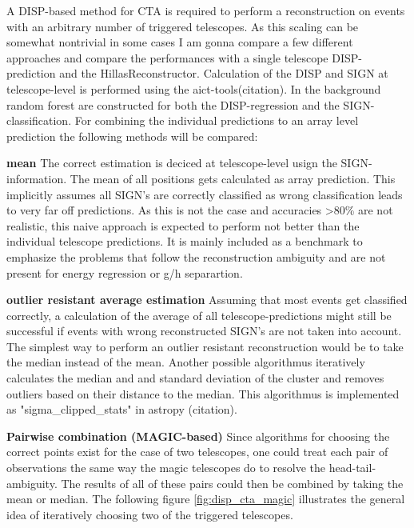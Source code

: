 A DISP-based method for CTA is required to perform a reconstruction on
events with an arbitrary number of triggered telescopes.
As this scaling can be somewhat nontrivial in some cases I am gonna
compare a few different approaches and compare the performances
with a single telescope DISP-prediction and the HillasReconstructor.
Calculation of the DISP and SIGN at
telescope-level is performed using the aict-tools(citation).
In the background random forest are constructed for both the
DISP-regression and the SIGN-classification.
For combining the individual predictions to an array level prediction
the following methods will be compared:

\textbf{mean}
The correct estimation is deciced at telescope-level usign the
SIGN-information. The mean of all positions gets calculated as
array prediction.
This implicitly assumes all SIGN's are correctly classified as
wrong classification leads to very far off predictions.
As this is not the case and accuracies >80\% are not realistic,
this naive approach is expected to perform not better than the individual
telescope predictions.
It is mainly included as a benchmark to emphasize the problems
that follow the reconstruction ambiguity and are not present for
energy regression or g/h separartion.


\textbf{outlier resistant average estimation}
Assuming that most events get classified correctly, a calculation of
the average of all telescope-predictions might still be successful if
events with wrong reconstructed SIGN's are not taken into account.
The simplest way to perform an outlier resistant reconstruction
would be to take the median instead of the mean.
Another possible algorithmus iteratively calculates
the median and and standard deviation of the cluster and removes
outliers based on their distance to the median.
This algorithmus is implemented as "sigma_clipped_stats" in astropy (citation).

\textbf{Pairwise combination (MAGIC-based)}
Since algorithms for choosing the correct points exist for the
case of two telescopes, one could treat each pair of observations 
the same way the magic telescopes do to resolve the head-tail-ambiguity.
The results of all of these pairs could then be combined by taking the mean 
or median.
The following figure \ref{fig:disp_cta_magic} illustrates the general idea of iteratively 
choosing two of the triggered telescopes.

